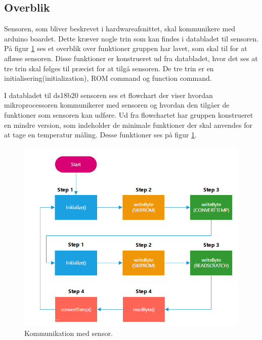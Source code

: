 \newpage

\subsection{Overblik}
Sensoren, som bliver beskrevet i hardwareafsnittet, skal kommunikere med arduino boardet. Dette kræver nogle trin som kan findes i databladet til sensoren. På figur \ref{sensor_kom} ses et overblik over funktioner gruppen har lavet, som skal til for at aflæse sensoren. Disse funktioner er konstrueret ud fra databladet, hvor det ses at tre trin skal følges til præcist for at tilgå sensoren. De tre trin er en initialisering(initialization), ROM command og function command.

I databladet til ds18b20 sensoren ses et flowchart der viser hvordan mikroprocessoren kommunikerer med sensoren og hvordan den tilgåer de funktioner som sensoren kan udføre. Ud fra flowchartet har gruppen konstrueret en mindre version, som indeholder de minimale funktioner der skal anvendes for at tage en temperatur måling. Desse funktioner ses på figur \ref{sensor_kom}.



\begin{figure}[h!]
  \centering
  \includegraphics[width=1\textwidth]{figures/sensor_communication.png}
  \caption{Kommunikation med sensor.}
  \label{sensor_kom}
\end{figure}
\\


